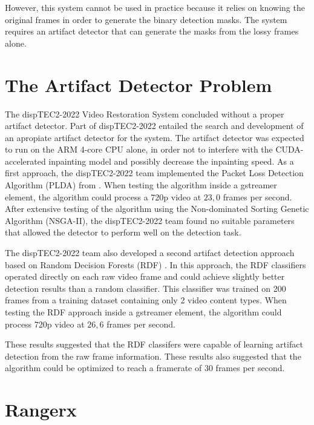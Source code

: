 However, this system cannot be used in practice because it relies on knowing the original frames in order to generate the binary detection masks. The system requires an artifact detector that can generate the masks from the lossy frames alone.

\section{The Artifact Detector Problem}
\label{sec:intro_problem}

The dispTEC2-2022 Video Restoration System concluded without a proper artifact detector. Part of dispTEC2-2022 entailed the search and development of an apropiate artifact detector for the system. The artifact detector was expected to run on the ARM 4-core CPU alone, in order not to interfere with the CUDA-accelerated inpainting model and possibly decrease the inpainting speed. As a first approach, the dispTEC2-2022 team implemented the Packet Loss Detection Algorithm (PLDA) from \cite{Vranjes2018}. When testing the algorithm inside a gstreamer element, the algorithm could process a 720p video at $23,0$ frames per second.  After extensive testing of the algorithm using the Non-dominated Sorting Genetic Algorithm (NSGA-II), the dispTEC2-2022 team found no suitable parameters that allowed the detector to perform well on the detection task.

The dispTEC2-2022 team also developed a second artifact detection approach based on Random Decision Forests (RDF) \cite{Breiman2001}. In this approach, the RDF classifiers operated directly on each raw video frame and could achieve slightly better detection results than a random classifier. This classifier was trained on 200 frames from a training dataset containing only 2 video content types. When testing the RDF approach inside a gstreamer element, the algorithm could process 720p video at $26,6$ frames per second.

These results suggested that the RDF classifers were capable of learning artifact detection from the raw frame information. These results also suggested that the algorithm could be optimized to reach a framerate of $30$ frames per second.


\section{Rangerx}
\label{sec:intro_detector}

